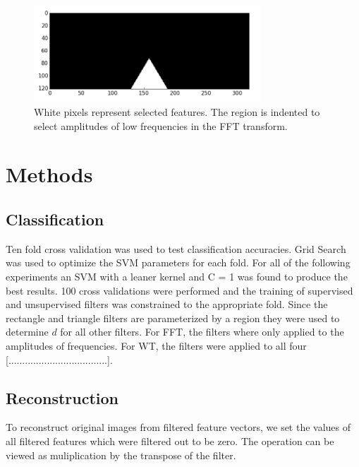 \documentclass{article}
\begin{document}
\begin{figure}[htb]

\begin{minipage}[b]{1.0\linewidth}
  \centering
  \centerline{\includegraphics[width=8.5cm]{tri}}
\end{minipage}
%
\caption{White pixels represent selected features. The region is indented to select amplitudes of low frequencies in the FFT transform.}
\label{fig:res}
%
\end{figure}

\section{Methods}
\label{sec:Method}

\subsection{Classification}

Ten fold cross validation was used to test classification accuracies. Grid Search was used to optimize the SVM parameters 
for each fold. For all of the following experiments an SVM with a leaner kernel and C = 1 was found to produce the best results. 
100 cross validations were performed and the training of supervised and unsupervised filters was constrained to the appropriate fold. 
Since the rectangle and triangle filters are parameterized by a region they were used to determine $d$ for all other filters. For FFT, the filters 
where only applied to the amplitudes of frequencies. For WT, the filters were applied to all four [....................................].     

\subsection{Reconstruction}

To reconstruct original images from filtered feature vectors, we set the values of all filtered features which were filtered out to be zero.
The operation can be viewed as muliplication by the transpose of the filter.  
\end{document}

